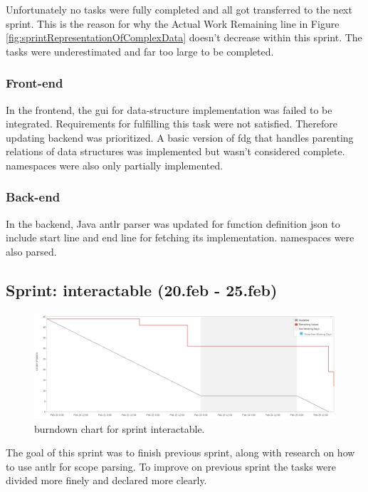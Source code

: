Unfortunately no tasks were fully completed and all got transferred to the next \gls{sprint}. This is the reason for why the Actual Work Remaining line in Figure \ref{fig:sprintRepresentationOfComplexData} doesn't decrease within this \gls{sprint}. The tasks were underestimated and far too large to be completed.

\subsubsection{Front-end}
In the \gls{frontend}, the \gls{gui} for data-structure implementation was failed to be integrated. Requirements for fulfilling this task were not satisfied. Therefore updating \gls{backend} was prioritized.
A basic version of \gls{fdg} that handles parenting relations of data structures was implemented but wasn't considered complete. \Glspl{namespace} were also only partially implemented.

\subsubsection{Back-end}
In the \gls{backend}, Java \gls{antlr} parser was updated for function definition \gls{json} to include start line and end line for fetching its implementation. \Glspl{namespace} were also parsed.


\subsection{Sprint: interactable (20.feb - 25.feb)}
\begin{figure}[H] 
    \includegraphics[width=\textwidth]{inc/images/sprints/sprintInteractable200219-250219.png}
    \caption{\Gls{burndown} chart for \gls{sprint} interactable.}
    \label{fig:sprintInteractable}
\end{figure}
The goal of this \gls{sprint} was to finish previous sprint, along with research on how to use \gls{antlr} for scope parsing. To improve on previous \gls{sprint} the tasks were divided more finely and declared more clearly.

